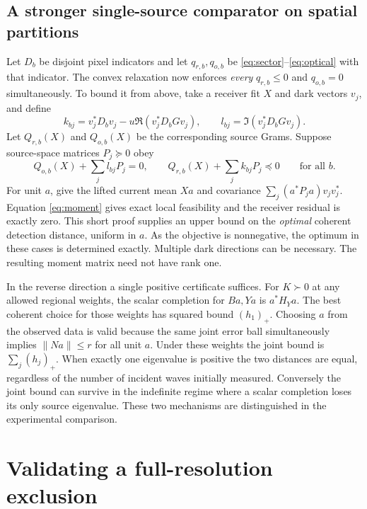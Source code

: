 \documentclass[anonymous,12pt]{iopjournal}
\theoremstyle{remark}\newtheorem{remark}[theorem]{Remark}
\numberwithin{equation}{section}
\begin{document}
\subsection{A stronger single-source comparator on spatial partitions}
Let $D_b$ be disjoint pixel indicators and let $q_{r,b},q_{o,b}$ be \eqref{eq:sector}--\eqref{eq:optical} with that indicator. The convex relaxation now enforces \emph{every} $q_{r,b}\le0$ and $q_{o,b}=0$ simultaneously. To bound it from above, take a receiver fit $X$ and dark vectors $v_j$, and define
\begin{equation}
 k_{bj}=v_j^*D_bv_j-u\Re(v_j^*D_bGv_j),\qquad
 l_{bj}=\Im(v_j^*D_bGv_j).\label{eq:localw}
\end{equation}
Let $Q_{r,b}(X)$ and $Q_{o,b}(X)$ be the corresponding source Grams. Suppose source-space matrices $P_j\succeq0$ obey
\begin{equation}
 Q_{o,b}(X)+\sum_j l_{bj}P_j=0,\qquad
 Q_{r,b}(X)+\sum_j k_{bj}P_j\preceq0\qquad\text{for all }b.\label{eq:moment}
\end{equation}
For unit $a$, give the lifted current mean $Xa$ and covariance $\sum_j(a^*P_j a)v_jv_j^*$. Equation \eqref{eq:moment} gives exact local feasibility and the receiver residual is exactly zero. This short proof supplies an upper bound on the \emph{optimal} coherent detection distance, uniform in $a$. As the objective is nonnegative, the optimum in these cases is determined exactly. Multiple dark directions can be necessary. The resulting moment matrix need not have rank one.

In the reverse direction a single positive certificate suffices. For $K\succ0$ at any allowed regional weights, the scalar completion for $Ba,Ya$ is $a^*H_Ya$. The best coherent choice for those weights has squared bound $(h_1)_+$. Choosing $a$ from the observed data is valid because the same joint error ball simultaneously implies $\|Na\|\le r$ for all unit $a$. Under these weights the joint bound is $\sum_j(h_j)_+$. When exactly one eigenvalue is positive the two distances are equal, regardless of the number of incident waves initially measured. Conversely the joint bound can survive in the indefinite regime where a scalar completion loses its only source eigenvalue. These two mechanisms are distinguished in the experimental comparison.

\section{Validating a full-resolution exclusion}\label{sec:fourier}
\end{document}
